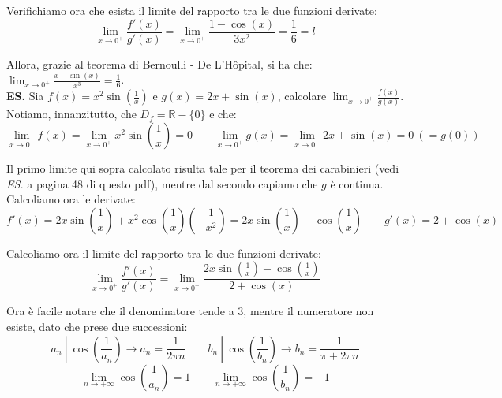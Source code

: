 \documentclass{article}
\begin{document}
\noindent Verifichiamo ora che esista il limite del rapporto tra le due funzioni derivate:
\begin{equation*}
    \lim_{x \to 0^+} \frac{f'(x)}{g'(x)} = \lim_{x \to 0^+} \frac{1 - \cos(x)}{3x^2} = \frac{1}{6} = l
\end{equation*}

\noindent Allora, grazie al teorema di Bernoulli - De L'Hôpital, si ha che: $\lim_{x \to 0^+} \frac{x - \sin(x)}{x^3} = \frac{1}{6}$.\\

\noindent\textbf{ES.} Sia $f(x) = x^2\sin(\frac{1}{x})$ e $g(x) = 2x + \sin(x)$, calcolare $\lim_{x \to 0^+} \frac{f(x)}{g(x)}$.\\
Notiamo, innanzitutto, che $D_f = \mathbb{R} - \{0\}$ e che:
\begin{equation*}
    \lim_{x \to 0^+} f(x) = \lim_{x \to 0^+} x^2\sin\left(\frac{1}{x}\right) = 0 \qquad \lim_{x \to 0^+} g(x) = \lim_{x \to 0^+} 2x + \sin(x) = 0 \ (= g(0))
\end{equation*}

\noindent Il primo limite qui sopra calcolato risulta tale per il teorema dei carabinieri (vedi \textit{ES.} a pagina 48 di questo pdf), mentre dal secondo capiamo che $g$ è continua. Calcoliamo ora le derivate:
\begin{equation*}
    f'(x) = 2x\sin\left(\frac{1}{x}\right) + x^2\cos\left(\frac{1}{x}\right)\left(-\frac{1}{x^2}\right) = 2x\sin\left(\frac{1}{x}\right)-\cos\left(\frac{1}{x}\right) \qquad g'(x) = 2 + \cos(x)
\end{equation*}

\noindent Calcoliamo ora il limite del rapporto tra le due funzioni derivate:
\begin{equation*}
    \lim_{x \to 0^+} \frac{f'(x)}{g'(x)} = \lim_{x \to 0^+} \frac{2x\sin\left(\frac{1}{x}\right)-\cos\left(\frac{1}{x}\right)}{2 + \cos(x)}
\end{equation*}

\noindent Ora è facile notare che il denominatore tende a $3$, mentre il numeratore non esiste, dato che prese due successioni:
\begin{equation*}
    a_n \ | \ \cos\left(\frac{1}{a_n}\right) \longrightarrow a_n = \frac{1}{2\pi n} \qquad b_n \ | \ \cos\left(\frac{1}{b_n}\right) \longrightarrow b _n = \frac{1}{\pi + 2\pi n}
\end{equation*}
\begin{equation*}
    \lim_{n \to +\infty} \cos\left(\frac{1}{a_n}\right) = 1 \qquad \lim_{n \to +\infty} \cos\left(\frac{1}{b_n}\right) = -1
\end{equation*}
\end{document}
